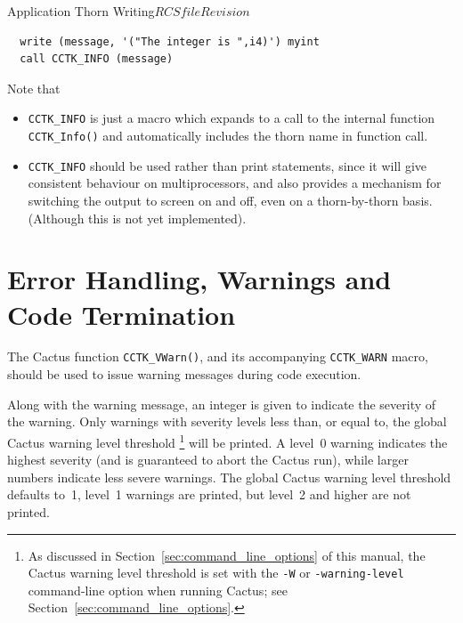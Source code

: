 \begin{cactuspart}{Application Thorn Writing}{$RCSfile$}{$Revision$}
\begin{verbatim}
  write (message, '("The integer is ",i4)') myint
  call CCTK_INFO (message)
\end{verbatim}

Note that
\begin{itemize}
\item{} \texttt{CCTK\_INFO} is just a macro which expands to a call to
        the internal function \texttt{CCTK\_Info()} and automatically includes
        the thorn name in function call.

\item{} \texttt{CCTK\_INFO} should be used rather than print statements,
       since it will give consistent behaviour on multiprocessors, and
       also provides a mechanism for switching the output to screen on
       and off, even on a thorn-by-thorn basis. (Although this is
       not yet implemented).
\end{itemize}


\section{Error Handling, Warnings and Code Termination}
\label{sec:erhawancote}
The Cactus function \texttt{CCTK\_VWarn()}, and its accompanying
\texttt{CCTK\_WARN} macro, should be used to issue warning messages
during code execution.

Along with the warning message, an integer is given to indicate the
severity of the warning.  Only warnings with severity levels less
than, or equal to, the global Cactus warning level threshold%
\footnote{%
         As discussed in Section~\ref{sec:command_line_options}
         of this manual, the Cactus warning level threshold is
         set with the \texttt{-W} or \texttt{-warning-level}
         command-line option when running Cactus; see
         Section~\ref{sec:command_line_options}.
         }%
{} will be printed.  A level~0 warning indicates the highest severity
(and is guaranteed to abort the Cactus run), while larger numbers
indicate less severe warnings.  The global Cactus warning level threshold
defaults to~1, \ie{} level~1 warnings are printed, but level~2 and higher
are not printed.


\end{cactuspart}
